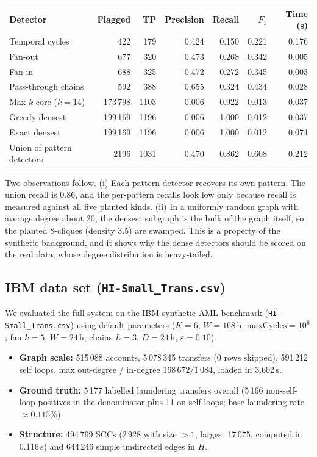 \documentclass[11pt,a4paper]{article}
\theoremstyle{definition}
\begin{document}
\begin{center}
\begin{tabular}{@{}lrrrrrr@{}}
\toprule
\textbf{Detector} & \textbf{Flagged} & \textbf{TP} & \textbf{Precision} & \textbf{Recall} & \textbf{$F_1$} & \textbf{Time (s)} \\
\midrule
Temporal cycles & 422 & 179 & 0.424 & 0.150 & 0.221 & 0.176 \\
Fan-out & 677 & 320 & 0.473 & 0.268 & 0.342 & 0.005 \\
Fan-in & 688 & 325 & 0.472 & 0.272 & 0.345 & 0.003 \\
Pass-through chains & 592 & 388 & 0.655 & 0.324 & 0.434 & 0.028 \\
Max $k$-core ($k = 14$) & 173\,798 & 1103 & 0.006 & 0.922 & 0.013 & 0.037 \\
Greedy densest & 199\,169 & 1196 & 0.006 & 1.000 & 0.012 & 0.037 \\
Exact densest & 199\,169 & 1196 & 0.006 & 1.000 & 0.012 & 0.074 \\
\midrule
Union of pattern detectors & 2196 & 1031 & 0.470 & 0.862 & 0.608 & 0.212 \\
\bottomrule
\end{tabular}
\end{center}

Two observations follow. (i) Each pattern detector recovers its own pattern. The union recall is 0.86, and the per-pattern recalls look low only because recall is measured against all five planted kinds. (ii) In a uniformly random graph with average degree about 20, the densest subgraph is the bulk of the graph itself, so the planted 8-cliques (density 3.5) are swamped. This is a property of the synthetic background, and it shows why the dense detectors should be scored on the real data, whose degree distribution is heavy-tailed.

\subsection{IBM data set (\texttt{HI-Small\_Trans.csv})}
We evaluated the full system on the IBM synthetic AML benchmark (\texttt{HI-Small\_Trans.csv}) using default parameters ($K = 6$, $W = 168\,\text{h}$, $\text{maxCycles} = 10^6$; fan $k = 5$, $W = 24\,\text{h}$; chains $L = 3$, $D = 24\,\text{h}$, $\varepsilon = 0.10$).

\begin{itemize}[leftmargin=1.5em]
\item \textbf{Graph scale:} 515\,088 accounts, 5\,078\,345 transfers (0 rows skipped), 591\,212 self loops, max out-degree / in-degree $168\,672 / 1\,084$, loaded in 3.602\,s.
\item \textbf{Ground truth:} 5\,177 labelled laundering transfers overall (5\,166 non-self-loop positives in the denominator plus 11 on self loops; base laundering rate $\approx 0.115\%$).
\item \textbf{Structure:} 494\,769 SCCs (2\,928 with size $> 1$, largest 17\,075, computed in 0.116\,s) and 644\,246 simple undirected edges in $H$.
\end{itemize}
\end{document}
